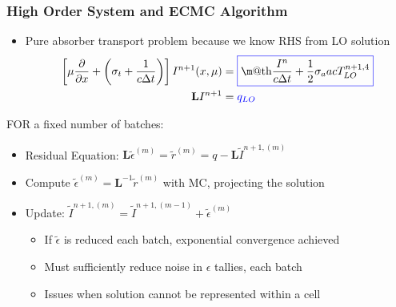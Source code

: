 \documentclass[xcolor=dvipsnames,hyperref={pdfpagelabels=false},handout,unknownkeysallowed]{beamer}
\makeatletter
\newcommand*{\boxedcolor}{blue}
\renewcommand{\boxed}[1]{\textcolor{\boxedcolor}{%
  \fbox{\normalcolor\m@th$\displaystyle#1$}}}
\newcommand{\colb}[1]{{\color{blue} #1}}
\newlength{\wideitemsep}
\let\olditem\item
\renewcommand{\item}{\setlength{\itemsep}{\wideitemsep}\olditem}
\newcommand{\pderiv}[2]{\frac{\partial #1}{\partial #2}}
\newcommand{\B}[1]{\ensuremath{\mathbf{#1}}}
\makeatother
\begin{document}
\begin{frame}
    \frametitle{High Order System and ECMC Algorithm}
    \begin{itemize}
        \item \colb{Pure absorber} transport problem because we know RHS from LO
            solution
        \begin{align*}
            \left[\mu \pderiv{}{x} + \left(\sigma_t+\frac{1}{c\Delta t}\right)\right]I^{n+1}(x,\mu)
            &= \boxed{\frac{I^{n}}{c\Delta t} + \frac{1}{2}\sigma_a a c T_{LO}^{n+1,4}} \\
            \B L I^{n+1} &= \colb{q_{LO}}
     \end{align*}
        \vspace{-0.3in}
        \end{itemize}
        \begin{block}{FOR a fixed number of batches:}
         \begin{itemize}
        \item Residual Equation: $\displaystyle \B L \tilde 
            \epsilon^{(m)} =
            \tilde r^{(m)} = q - \B L \tilde I^{n+1,(m)}$
        \item Compute $\tilde{\epsilon}^{(m)} = \B L^{-1} \tilde{r}^{(m)}$ with MC,
            \colb{projecting} the solution  
        \item Update: $\tilde I^{n+1,(m)} = \tilde I^{n+1,(m-1)} + \tilde \epsilon^{(m)}$
        \begin{itemize}
            \item If $\tilde{\epsilon}$ is reduced each batch, \colb{exponential convergence
                achieved}
             \item Must sufficiently reduce noise in $\epsilon$ tallies, each batch
             \item Issues when solution cannot be represented within a cell
        \end{itemize}
    \end{itemize}
\end{block}
\end{frame}
\end{document}
